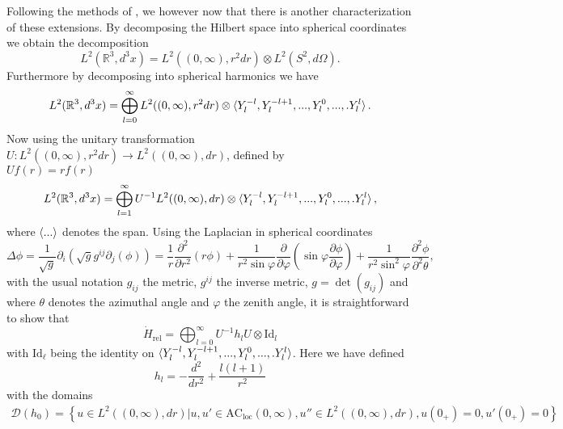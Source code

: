 \documentclass[a4paper,11pt]{article}
\newcommand{\dom}[1]{\mathscr D\left(#1\right)}
\newcommand{\R}{\mathbb{R}}
\numberwithin{equation}{section}
\begin{document}
Following the methods of \cite{albeverio2012solvable}, we however now that there is another characterization of these extensions. By decomposing the Hilbert space into spherical coordinates we obtain the decomposition \begin{equation}
L^2(\R^3,d^3x)=L^2((0,\infty),r^2dr)\otimes L^2(S^2,d\Omega).
\end{equation}
Furthermore by decomposing into spherical harmonics we have \begin{equation}
L^2(\R^3,d^3x)=\bigoplus_{l=0}^{\infty}L^2((0,\infty),r^2dr)\otimes \braket{Y_l^{-l},Y_l^{-l+1},...,Y_l^0,...,.Y_l^l}.
\end{equation}
Now using the unitary transformation $ U:L^2((0,\infty),r^2dr)\to L^2((0,\infty),dr) $, defined by\\ $ Uf(r)=rf(r) $
\begin{equation}
L^2(\R^3,d^3x)=\bigoplus_{l=1}^{\infty}U^{-1}L^2((0,\infty),dr)\otimes \braket{Y_l^{-l},Y_l^{-l+1},...,Y_l^0,...,.Y_l^l},
\end{equation}
where $ \braket{...} $ denotes the span. Using the Laplacian in spherical coordinates \begin{equation}
\Delta\phi=\frac{1}{\sqrt{g}}\partial_i(\sqrt{g}g^{ij}\partial_j(\phi))=\frac{1}{r}\frac{\partial^2}{\partial r^2}(r\phi)+\frac{1}{r^2\sin\varphi}\frac{\partial}{\partial\varphi}(\sin\varphi\frac{\partial\phi}{\partial\varphi})+\frac{1}{r^2\sin^2\varphi}\frac{\partial^2\phi}{\partial^2\theta},
\end{equation} with the usual notation $ g_{ij} $ the metric, $ g^{ij} $ the inverse metric, $ g=\det(g_{ij}) $ and where $ \theta $ denotes the azimuthal angle and $ \varphi $ the zenith angle, it is straightforward to show that\begin{equation}
\dot{H}_{\text{rel}}=\bigoplus_{l=0}^{\infty}U^{-1}h_lU\otimes\text{Id}_{l}
\end{equation}
with $ \text{Id}_\ell $ being the identity on $ \braket{Y_l^{-l},Y_l^{-l+1},...,Y_l^0,...,.Y_l^l} $. Here we have defined \begin{equation}
h_l=-\frac{d^2}{dr^2}+\frac{l(l+1)}{r^2}
\end{equation}
with the domains\begin{equation}
\begin{aligned}\dom{h_0}=\left\{u\in L^2((0,\infty),dr)|u,u'\in\text{AC}_{\text{loc}}(0,\infty),u''\in L^2((0,\infty),dr), u(0_+)=0, u'(0_+)=0\right\}
\end{aligned}
\end{equation}
\end{document}
